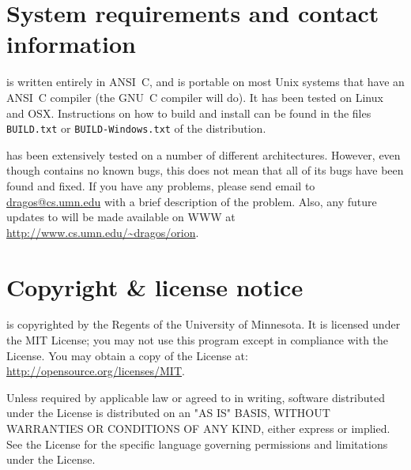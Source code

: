 \documentclass[]{article}
\begin{document}
\section{System requirements and contact information}
\label{sec:epilogue}

\orion is written entirely in ANSI~C, and is portable on most Unix systems
that have an ANSI~C compiler (the GNU~C compiler will do). It has been
tested on Linux and OSX. Instructions on how to build and install
\orion can be found in the files {\tt BUILD.txt} or {\tt BUILD-Windows.txt} of
the distribution.

\orion has been extensively tested on a number of different architectures.
However, even though \orion contains no known bugs, this does not mean that all
of its bugs have been found and fixed. If you have any problems, please send email to
\href{mailto:dragos@cs.umn.edu}{dragos@cs.umn.edu} with a brief description of
the problem. Also, any future updates to \orion will be made available on WWW at
\href{http://www.cs.umn.edu/~dragos/orion}{http://www.cs.umn.edu/\~{}dragos/orion\/}.

\section{Copyright \& license notice}
\label{sec:license}

\orion is copyrighted by the Regents of the University of Minnesota. 
It is licensed under the MIT License;
you may not use this program except in compliance with the License.
You may obtain a copy of the License at: 
\href{http://opensource.org/licenses/MIT}{http://opensource.org/licenses/MIT}.

Unless required by applicable law or agreed to in writing, software
distributed under the License is distributed on an "AS IS" BASIS,
WITHOUT WARRANTIES OR CONDITIONS OF ANY KIND, either express or
implied. See the License for the specific language governing
permissions and limitations under the License.



\clearpage
{


}
\end{document}
